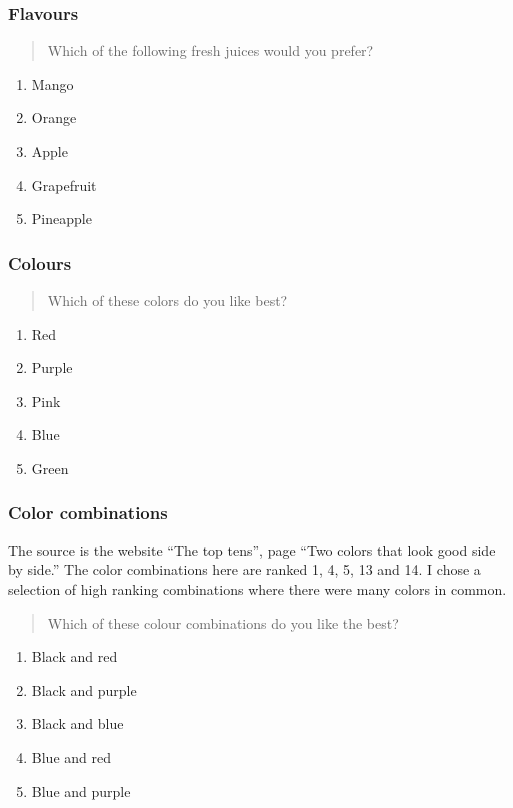 \documentclass[11pt,letter]{amsart}
\begin{document}
\subsubsection{Flavours}

\begin{quotation}
Which of the following fresh juices would you prefer?
\end{quotation}

\begin{enumerate}
\item Mango 
\item Orange 
\item Apple 
\item Grapefruit 
\item Pineapple
\end{enumerate}

\subsubsection{Colours}

\begin{quotation}
Which of these colors do you like best?
\end{quotation}

\begin{enumerate}
\item Red 
\item Purple 
\item Pink 
\item Blue 
\item Green
\end{enumerate}

\subsubsection{Color combinations}

The source is the website ``The top tens'', page ``Two colors that look good
side by side.'' The color combinations here are ranked 1, 4, 5, 13 and 14. I
chose a selection of high ranking combinations where there were many colors
in common.

\begin{quotation}
Which of these colour combinations do you like the best?
\end{quotation}

\begin{enumerate}
\item Black and red 

\item Black and purple 

\item Black and blue 

\item Blue and red 

\item Blue and purple
\end{enumerate}
\end{document}
